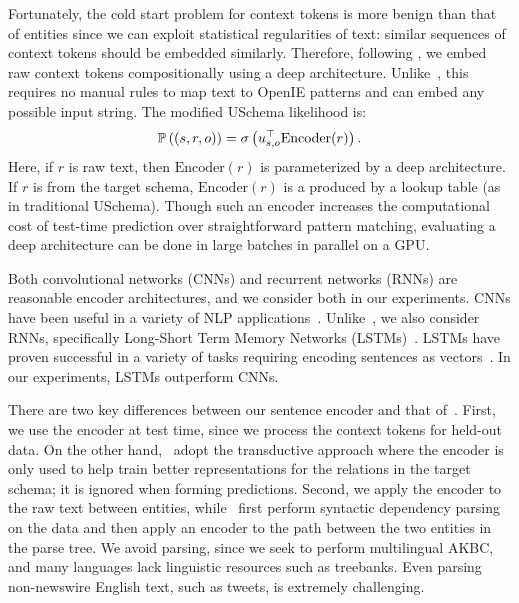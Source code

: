 Fortunately, the cold start problem for context tokens is more benign than that of entities since we can exploit statistical regularities of text: similar sequences of context tokens should be embedded similarly. Therefore, following \citet{toutanova2015representing}, we  embed raw context tokens compositionally using a deep architecture. Unlike~\citet{limin}, this requires no manual rules to map text to OpenIE patterns and can embed any possible input string. The modified USchema likelihood is:
\begin{equation}
\mathbb{P} \left((s,r,o)\right) = \sigma\left( u_{s,o}^\top \text{Encoder}(r) \right).
\end{equation}
Here, if $r$ is raw text, then $\text{Encoder}(r)$ is parameterized by a deep architecture. If $r$ is from the target schema, $\text{Encoder}(r)$ is a produced by a lookup table (as in traditional USchema). Though such an encoder increases the computational cost of test-time prediction over straightforward pattern matching, evaluating a deep architecture can be done in large batches in parallel on a GPU.

Both convolutional networks (CNNs) and recurrent networks (RNNs) are reasonable encoder architectures, and we consider both in our experiments. CNNs have been useful in a variety of NLP applications~\citep{collobert2011natural,KalchbrennerACL2014,kim2014convolutional}. Unlike~\citet{toutanova2015representing}, we also consider RNNs, specifically Long-Short Term Memory Networks (LSTMs)~\citep{lstm}. LSTMs have proven successful in a variety of tasks requiring encoding sentences as vectors~\citep{rnnmt,rnnparse}. In our experiments, LSTMs outperform CNNs.

There are two key differences between our sentence encoder and that of~\citet{toutanova2015representing}.  First, we use the encoder at test time, since we process the context tokens for held-out data. On the other hand,~\citet{toutanova2015representing} adopt the transductive approach where the encoder is only used to help train better representations for the relations in the target schema; it is ignored when forming predictions.  Second, we apply the encoder to the raw text between entities, while~\citet{toutanova2015representing} first perform syntactic dependency parsing on the data and then apply an encoder to the path between the two entities in the parse tree. We avoid parsing, since we seek to perform multilingual AKBC, and many languages lack linguistic resources such as treebanks. Even parsing non-newswire English text, such as tweets, is extremely challenging. %

